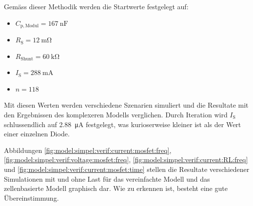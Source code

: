 Gem\"ass dieser Methodik werden die Startwerte festgelegt auf:

\begin{itemize}
    \firmlist
    \item
        $C_{\mathrm{p, Modul}} = \SI{167}{\nano\farad}$
    \item
        $R_{\mathrm{S}} = \SI{12}{\milli\ohm}$
    \item
        $R_{\mathrm{Shunt}} = \SI{60}{\kilo\ohm}$
    \item
        $I_{\mathrm{S}} = \SI{288}{\milli\ampere}$
    \item
        $n = 118$
\end{itemize}

Mit diesen  Werten werden verschiedene  Szenarien simuliert und  die Resultate
mit den  Ergebnissen des komplexeren Modells  verglichen. Durch Iteration wird
$I_{\mathrm{S}}$ schlussendlich  auf \SI{2.88}{\micro\ampere}  festgelegt, was
kurioserweise kleiner ist als der Wert einer einzelnen Diode.

Abbildungen
\ref{fig:model:simpel:verif:current:mosfet:freq},
\ref{fig:model:simpel:verif:voltage:mosfet:freq},
\ref{fig:model:simpel:verif:current:RL:freq} und
\ref{fig:model:simpel:verif:current:mosfet:time} stellen die Resultate
verschiedener Simulationen mit und ohne Last f\"ur das vereinfachte Modell und
das zellenbasierte  Modell graphisch dar.   Wie zu erkennen ist,  besteht eine
gute \"Ubereinstimmung.




